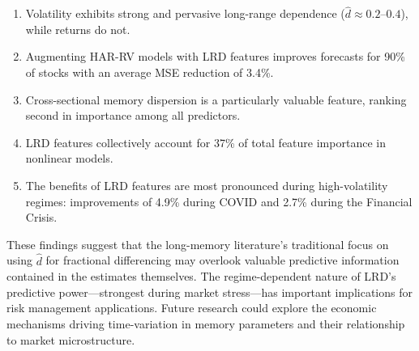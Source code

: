\documentclass[12pt,a4paper]{article}
\begin{document}
\begin{enumerate}
    \item Volatility exhibits strong and pervasive long-range dependence ($\hat{d} \approx 0.2$--$0.4$), while returns do not.
    \item Augmenting HAR-RV models with LRD features improves forecasts for 90\% of stocks with an average MSE reduction of 3.4\%.
    \item Cross-sectional memory dispersion is a particularly valuable feature, ranking second in importance among all predictors.
    \item LRD features collectively account for 37\% of total feature importance in nonlinear models.
    \item The benefits of LRD features are most pronounced during high-volatility regimes: improvements of 4.9\% during COVID and 2.7\% during the Financial Crisis.
\end{enumerate}

These findings suggest that the long-memory literature's traditional focus on using $\hat{d}$ for fractional differencing may overlook valuable predictive information contained in the estimates themselves. The regime-dependent nature of LRD's predictive power---strongest during market stress---has important implications for risk management applications. Future research could explore the economic mechanisms driving time-variation in memory parameters and their relationship to market microstructure.



% 
\end{document}
